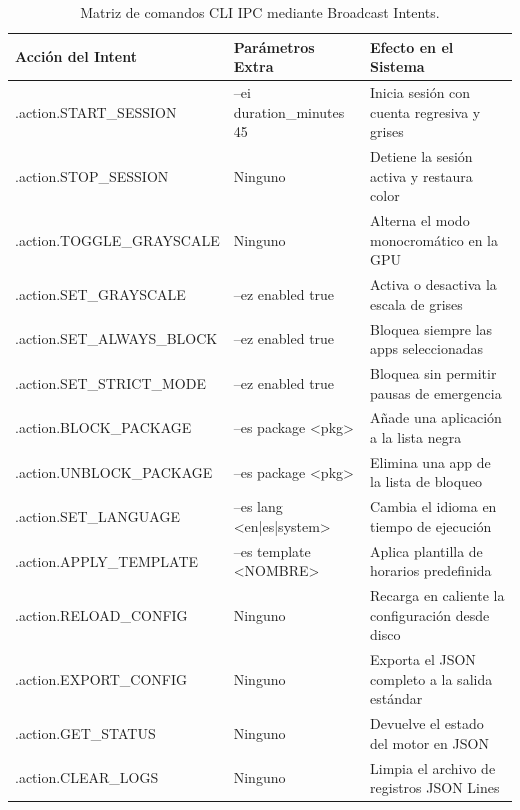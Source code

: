 \documentclass[11pt,a4paper,oneside]{report}
\begin{document}
\begin{table}[h!]
\centering
\small
\begin{tabularx}{\textwidth}{>{\raggedright\arraybackslash\ttfamily\footnotesize}p{5.2cm} >{\raggedright\arraybackslash\ttfamily\footnotesize}p{4.2cm} >{\raggedright\arraybackslash}X}
\toprule
\textbf{\textrm{\textbf{Acción del Intent}}} & \textbf{\textrm{\textbf{Parámetros Extra}}} & \textbf{\textrm{\textbf{Efecto en el Sistema}}} \\
\midrule
.action.START\_SESSION & --ei duration\_minutes 45 & Inicia sesión con cuenta regresiva y grises \\
.action.STOP\_SESSION & Ninguno & Detiene la sesión activa y restaura color \\
.action.TOGGLE\_GRAYSCALE & Ninguno & Alterna el modo monocromático en la GPU \\
.action.SET\_GRAYSCALE & --ez enabled true & Activa o desactiva la escala de grises \\
.action.SET\_ALWAYS\_BLOCK & --ez enabled true & Bloquea siempre las apps seleccionadas \\
.action.SET\_STRICT\_MODE & --ez enabled true & Bloquea sin permitir pausas de emergencia \\
.action.BLOCK\_PACKAGE & --es package <pkg> & Añade una aplicación a la lista negra \\
.action.UNBLOCK\_PACKAGE & --es package <pkg> & Elimina una app de la lista de bloqueo \\
.action.SET\_LANGUAGE & --es lang <en|es|system> & Cambia el idioma en tiempo de ejecución \\
.action.APPLY\_TEMPLATE & --es template <NOMBRE> & Aplica plantilla de horarios predefinida \\
.action.RELOAD\_CONFIG & Ninguno & Recarga en caliente la configuración desde disco \\
.action.EXPORT\_CONFIG & Ninguno & Exporta el JSON completo a la salida estándar \\
.action.GET\_STATUS & Ninguno & Devuelve el estado del motor en JSON \\
.action.CLEAR\_LOGS & Ninguno & Limpia el archivo de registros JSON Lines \\
\bottomrule
\end{tabularx}
\caption{Matriz de comandos CLI IPC mediante Broadcast Intents.}
\label{tab:cli_commands}
\end{table}

\newpage

\end{document}
